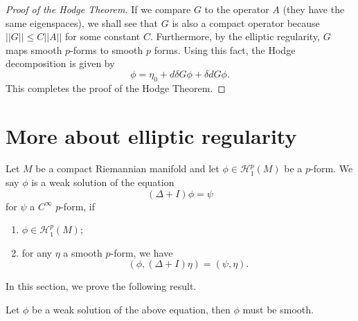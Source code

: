 \begin{proof}[Proof of the Hodge Theorem]
If we compare $G$ to the operator $A$ (they  have
the same eigenspaces), we shall see that
$G$ is also a compact  operator because $||G||\leq
C||A||$ for some constant $C$.
Furthermore, by the elliptic regularity, $G$ maps
smooth $p$-forms to smooth  $p$
forms.
Using this
fact, the Hodge decomposition is given by
\[
\phi=\eta_0+d\delta G\phi+\delta dG\phi.
\]
This completes the proof of the Hodge Theorem.

\end{proof}

\section{More about elliptic regularity}
Let $M$ be a compact Riemannian manifold and let $\phi\in \mathcal H^p_1(M)$ be a $p$-form. We say 
$\phi$ is a weak solution of the equation
\[
(\Delta+I)\phi=\psi
\]
for $\psi$ a $C^\infty$ $p$-form, if
\begin{enumerate}
\item $\phi\in \mathcal H^p_1(M)$;
\item for any $\eta$ a smooth $p$-form, we have
\[
(\phi,(\Delta+I)\eta)=(\psi,\eta).
\]
\end{enumerate}

In this section, we prove the following result.
\begin{theorem} Let $\phi$ be a weak solution of the above equation, then $\phi$ must be smooth.
\end{theorem}

